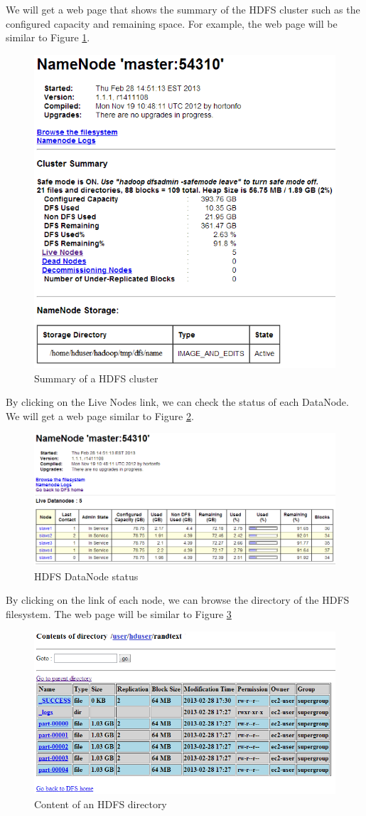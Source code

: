 We will get a web page that shows the summary of the HDFS cluster such as the configured capacity and remaining space. For example, the web page will be similar to Figure \ref{fig:hdfs.summary}.
\begin{figure}[ht]
  \centering
  \includegraphics[width=.7\textwidth]{figs/5163os_04_08.png}
  \caption{Summary of a HDFS cluster}\label{fig:hdfs.summary}
\end{figure} 

By clicking on the Live Nodes link, we can check the status of each DataNode. We will get a web page similar to Figure \ref{fig:datanode.status}.
\begin{figure}[ht]
  \centering
  \includegraphics[width=.9\textwidth]{figs/5163os_04_09.png}
  \caption{HDFS DataNode status}\label{fig:datanode.status}
\end{figure} 

By clicking on the link of each node, we can browse the directory of the HDFS filesystem. The web page will be similar to Figure \ref{fig:content.hdfs}
\begin{figure}[ht]
  \centering
  \includegraphics[width=.8\textwidth]{figs/5163os_04_10.png}
  \caption{Content of an HDFS directory}\label{fig:content.hdfs}
\end{figure} 

